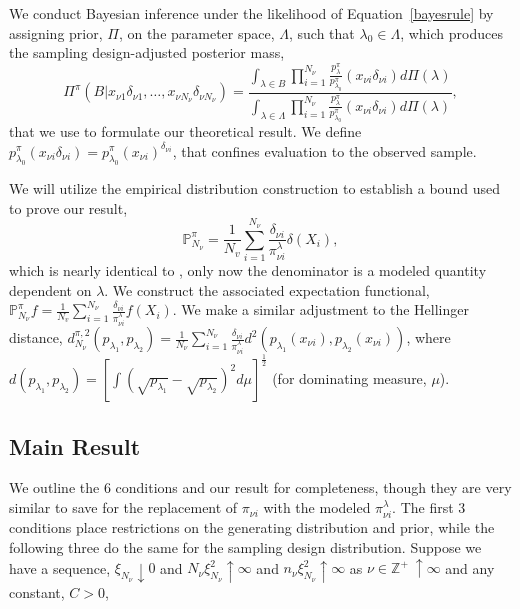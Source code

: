 \documentclass[]{imsart}
\begin{document}
We conduct Bayesian inference under the likelihood of Equation~\eqref{bayesrule} by assigning prior, $\Pi$, on the parameter space, $\Lambda$, such that $\lambda_{0} \in \Lambda$, which produces the sampling design-adjusted posterior mass,
\begin{equation}\label{inform_post}
\Pi^{\pi}\left(B\vert x_{\nu 1}\delta_{\nu 1},\ldots,x_{\nu N_{\nu}}\delta_{\nu N_{\nu}}\right) = \frac{\mathop{\int}_{\lambda \in B}\mathop{\prod}_{i=1}^{N_{\nu}}\frac{p_{\lambda}^{\pi}}{p_{\lambda_{0}}^{\pi}}(x_{\nu i}\delta_{\nu i})d\Pi(\lambda)}{\mathop{\int}_{\lambda \in \Lambda}\mathop{\prod}_{i=1}^{N_{\nu}}\frac{p_{\lambda}^{\pi}}{p_{\lambda_{0}}^{\pi}}(x_{\nu i}\delta_{\nu i})d\Pi(\lambda)},
\end{equation}
that we use to formulate our theoretical result.  We define $\displaystyle p_{\lambda_{0}}^{\pi}(x_{\nu i}\delta_{\nu i}) = p_{\lambda_{0}}^{\pi}(x_{\nu i})^{\delta_{\nu i}}$, that confines evaluation to the observed sample.

We will utilize the empirical distribution construction to establish a bound used to prove our result,
\begin{equation}
\mathbb{P}^{\pi}_{N_{\nu}} = \frac{1}{N_{v}}\mathop{\sum}_{i=1}^{N_{\nu}}\frac{\delta_{\nu i}}{\pi_{\nu i}^{\lambda}}\delta\left(X_{i}\right),
\end{equation}
which is nearly identical to \citet{savitsky2016bayesian}, only now the denominator is a modeled quantity dependent on $\lambda$.  We construct the associated expectation functional, $\mathbb{P}^{\pi}_{N_{\nu}}f = \frac{1}{N_{v}}\mathop{\sum}_{i=1}^{N_{\nu}}\frac{\delta_{\nu i}}{\pi_{\nu i}^{\lambda}}f\left(X_{i}\right)$.  We make a similar adjustment to the Hellinger distance,
\newline
$d^{\pi,2}_{N_{\nu}}\left(p_{\lambda_{1}},p_{\lambda_{2}}\right) = \frac{1}{N_{\nu}}\mathop{\sum}_{i=1}^{N_{\nu}}\frac{\delta_{\nu i}}{\pi_{\nu i}^{\lambda}}d^{2}\left(p_{\lambda_{1}}(x_{\nu i}),p_{\lambda_{2}}(x_{\nu i})\right)$,
\newline
where $d\left(p_{\lambda_{1}},p_{\lambda_{2}}\right) = \left[\mathop{\int}\left(\sqrt{p_{\lambda_{1}}}-\sqrt{p_{\lambda_{2}}}\right)^{2}d\mu\right]^{\frac{1}{2}}$ (for dominating measure, $\mu$).

\subsection{Main Result}\label{results}
We outline the $6$ conditions and our result for completeness, though they are very similar to \citet{savitsky2016bayesian} save for the replacement of $\pi_{\nu i}$ with the modeled $\pi_{\nu i}^{\lambda}$.  The first $3$ conditions place restrictions on the generating distribution and prior, while the following three do the same for the sampling design distribution. Suppose we have a  sequence, $\xi_{N_{\nu}} \downarrow 0$ and $N_{\nu}\xi^{2}_{N_{\nu}}\uparrow\infty$  and $n_{\nu}\xi^{2}_{N_{\nu}}\uparrow\infty$ as $\nu\in\mathbb{Z}^{+}~\uparrow\infty$ and any constant, $C >0$,
\end{document}
